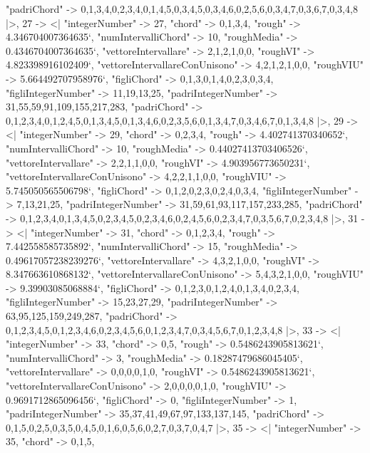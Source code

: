 \documentclass[
]{article}
\begin{document}
\begin{DatasetVerbatim}
    "padriChord" -> {{0,1,3,4},{0,2,3,4},{0,1,4,5},{0,3,4,5},{0,3,4,6},{0,2,5,6},{0,3,4,7},{0,3,6,7},{0,3,4,8}}
  |>,
  27 -> <|
    "integerNumber" -> 27,
    "chord" -> {0,1,3,4},
    "rough" -> 4.346704007364635`,
    "numIntervalliChord" -> 10,
    "roughMedia" -> 0.4346704007364635`,
    "vettoreIntervallare" -> {2,1,2,1,0,0},
    "roughVI" -> 4.823398916102409`,
    "vettoreIntervallareConUnisono" -> {4,2,1,2,1,0,0},
    "roughVIU" -> 5.664492707958976`,
    "figliChord" -> {{0,1,3},{0,1,4},{0,2,3},{0,3,4}},
    "figliIntegerNumber" -> {11,19,13,25},
    "padriIntegerNumber" -> {31,55,59,91,109,155,217,283},
    "padriChord" -> {{0,1,2,3,4},{0,1,2,4,5},{0,1,3,4,5},{0,1,3,4,6},{0,2,3,5,6},{0,1,3,4,7},{0,3,4,6,7},{0,1,3,4,8}}
  |>,
  29 -> <|
    "integerNumber" -> 29,
    "chord" -> {0,2,3,4},
    "rough" -> 4.402741370340652`,
    "numIntervalliChord" -> 10,
    "roughMedia" -> 0.44027413703406526`,
    "vettoreIntervallare" -> {2,2,1,1,0,0},
    "roughVI" -> 4.903956773650231`,
    "vettoreIntervallareConUnisono" -> {4,2,2,1,1,0,0},
    "roughVIU" -> 5.745050565506798`,
    "figliChord" -> {{0,1,2},{0,2,3},{0,2,4},{0,3,4}},
    "figliIntegerNumber" -> {7,13,21,25},
    "padriIntegerNumber" -> {31,59,61,93,117,157,233,285},
    "padriChord" -> {{0,1,2,3,4},{0,1,3,4,5},{0,2,3,4,5},{0,2,3,4,6},{0,2,4,5,6},{0,2,3,4,7},{0,3,5,6,7},{0,2,3,4,8}}
  |>,
  31 -> <|
    "integerNumber" -> 31,
    "chord" -> {0,1,2,3,4},
    "rough" -> 7.442558585735892`,
    "numIntervalliChord" -> 15,
    "roughMedia" -> 0.49617057238239276`,
    "vettoreIntervallare" -> {4,3,2,1,0,0},
    "roughVI" -> 8.347663610868132`,
    "vettoreIntervallareConUnisono" -> {5,4,3,2,1,0,0},
    "roughVIU" -> 9.39903085068884`,
    "figliChord" -> {{0,1,2,3},{0,1,2,4},{0,1,3,4},{0,2,3,4}},
    "figliIntegerNumber" -> {15,23,27,29},
    "padriIntegerNumber" -> {63,95,125,159,249,287},
    "padriChord" -> {{0,1,2,3,4,5},{0,1,2,3,4,6},{0,2,3,4,5,6},{0,1,2,3,4,7},{0,3,4,5,6,7},{0,1,2,3,4,8}}
  |>,
  33 -> <|
    "integerNumber" -> 33,
    "chord" -> {0,5},
    "rough" -> 0.5486243905813621`,
    "numIntervalliChord" -> 3,
    "roughMedia" -> 0.18287479686045405`,
    "vettoreIntervallare" -> {0,0,0,0,1,0},
    "roughVI" -> 0.5486243905813621`,
    "vettoreIntervallareConUnisono" -> {2,0,0,0,0,1,0},
    "roughVIU" -> 0.9691712865096456`,
    "figliChord" -> {{0}},
    "figliIntegerNumber" -> {1},
    "padriIntegerNumber" -> {35,37,41,49,67,97,133,137,145},
    "padriChord" -> {{0,1,5},{0,2,5},{0,3,5},{0,4,5},{0,1,6},{0,5,6},{0,2,7},{0,3,7},{0,4,7}}
  |>,
  35 -> <|
    "integerNumber" -> 35,
    "chord" -> {0,1,5},

\end{DatasetVerbatim}
\end{document}

